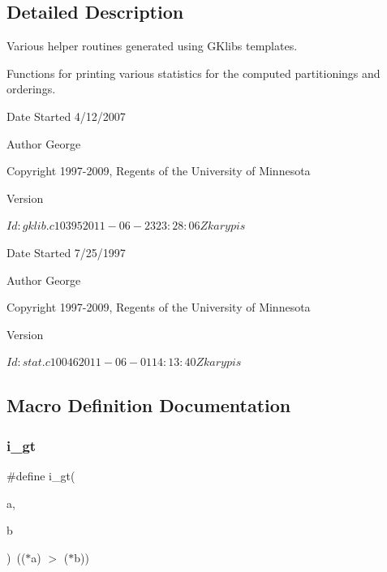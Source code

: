 \subsection{Detailed Description}
Various helper routines generated using G\+Klib\textquotesingle{}s templates. 

Functions for printing various statistics for the computed partitionings and orderings.

\begin{DoxyDate}{Date}
Started 4/12/2007 
\end{DoxyDate}
\begin{DoxyAuthor}{Author}
George 

Copyright 1997-\/2009, Regents of the University of Minnesota 
\end{DoxyAuthor}
\begin{DoxyVersion}{Version}
\begin{DoxyVerb}$Id: gklib.c 10395 2011-06-23 23:28:06Z karypis $ \end{DoxyVerb}

\end{DoxyVersion}
\begin{DoxyDate}{Date}
Started 7/25/1997 
\end{DoxyDate}
\begin{DoxyAuthor}{Author}
George 

Copyright 1997-\/2009, Regents of the University of Minnesota 
\end{DoxyAuthor}
\begin{DoxyVersion}{Version}
\begin{DoxyVerb}$Id: stat.c 10046 2011-06-01 14:13:40Z karypis $ \end{DoxyVerb}
 
\end{DoxyVersion}


\subsection{Macro Definition Documentation}
\mbox{\label{a00206_a7f7479725208e56a4d49209aa2301a13}} 
\subsubsection{\texorpdfstring{i\+\_\+gt}{i\_gt}}
{\footnotesize\ttfamily \#define i\+\_\+gt(\begin{DoxyParamCaption}\item[{}]{a,  }\item[{}]{b }\end{DoxyParamCaption})~(($\ast$a) $>$ ($\ast$b))}

